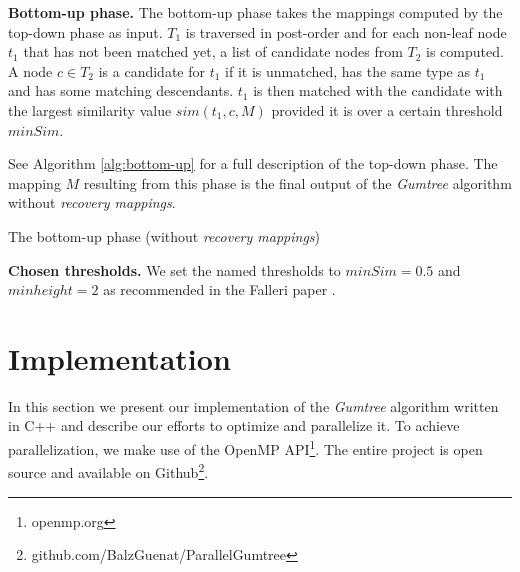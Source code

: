 \documentclass[letterpaper]{article}
\newcommand{\mypar}[1]{{\bf #1.}}
\begin{document}
\mypar{Bottom-up phase}
The bottom-up phase takes the mappings computed by the top-down phase as input.
$T_1$ is traversed in post-order and for each non-leaf node $t_1$ that has not been matched yet, a list of candidate nodes from $T_2$ is computed.
A node $c \in T_2$ is a candidate for $t_1$ if it is unmatched, has the same type as $t_1$ and has some matching descendants.
$t_1$ is then matched with the candidate with the largest similarity value $sim(t_1,c,M)$ provided it is over a certain threshold $minSim$.

See Algorithm \ref{alg:bottom-up} for a full description of the top-down phase.
The mapping $M$ resulting from this phase is the final output of the \emph{Gumtree} algorithm without \emph{recovery mappings}.

\begin{algorithm}
\caption{The bottom-up phase (without \emph{recovery mappings})}
\label{alg:bottom-up}
\end{algorithm}

\mypar{Chosen thresholds}
We set the named thresholds to $minSim=0.5$ and $minheight=2$ as recommended in the Falleri paper \cite{falleri:2014:structure_diff}.

\section{Implementation}\label{sec:yourmethod}

In this section we present our implementation of the \emph{Gumtree} algorithm written in C++ and describe our efforts to optimize and parallelize it.
To achieve parallelization, we make use of the OpenMP API\footnote{openmp.org}.
The entire project is open source and available on Github\footnote{github.com/BalzGuenat/ParallelGumtree}.
\end{document}
